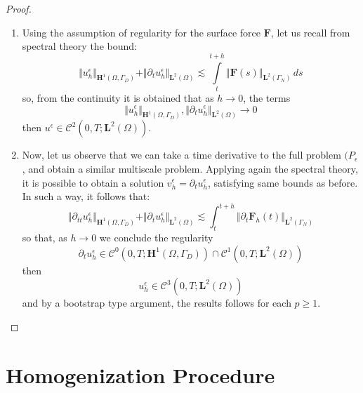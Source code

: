 \begin{proof}
\begin{enumerate}
    
    \item Using the assumption of regularity for the surface force $\mathbf{F}$, let us recall from spectral theory the bound:
    \begin{equation*}
        \Vert u_h^{\epsilon} \Vert_{\mathbf{H}^1(\Omega, \Gamma_D)} + \Vert \partial_t u_h^{\epsilon}\Vert_{\mathbf{L}^2(\Omega)} \lesssim \int \limits_t^{t+h} \Vert \mathbf{F}(s) \Vert_{\mathbf{L}^2(\Gamma_N)} \, ds
    \end{equation*}
    so, from the continuity it is obtained that as $h \rightarrow 0$, the terms 
    \begin{equation*}
        \Vert u_h^{\epsilon} \Vert_{\mathbf{H}^1(\Omega, \Gamma_D)}, \Vert \partial_t u_h^{\epsilon} \Vert_{\mathbf{L}^2 (\Omega)} \rightarrow 0
    \end{equation*}
    then $u^{\epsilon} \in \mathcal{C}^2(0,T; \mathbf{L}^2(\Omega))$.
    
    
    \item Now, let us observe that we can take a time derivative to the full problem $(P_{\epsilon}$, and obtain a similar multiscale problem. Applying again the spectral theory, it is possible to obtain a solution $v_h^{\epsilon} = \partial_t u_h^{\epsilon}$, satisfying same bounds as before. In such a way, it follows that:
    \begin{equation*}
        \Vert \partial_{tt} u_h^{\epsilon} \Vert_{\mathbf{H}^1(\Omega, \Gamma_D)} + \Vert \partial_t u_h^{\epsilon} \Vert_{\mathbf{L}^2 (\Omega)} \lesssim \int_t^{t+h} \Vert \partial_t \mathbf{F}_h(t) \Vert_{\mathbf{L}^2(\Gamma_N)}
    \end{equation*}
    so that, as $h \rightarrow 0$ we conclude the regularity
    \begin{equation*}
        \partial_t u_h^{\epsilon} \in \mathcal{C}^0(0,T;\mathbf{H}^1(\Omega, \Gamma_D)) \cap \mathcal{C}^1(0,T;\mathbf{L}^2(\Omega)) 
    \end{equation*}
    then
    \begin{equation*}
        u_h^{\epsilon} \in \mathcal{C}^3(0,T; \mathbf{L}^2(\Omega))
    \end{equation*}
    and by a bootstrap type argument, the results follows for each $p \geq 1$.
\end{enumerate}

\end{proof}



\section{Homogenization Procedure}

